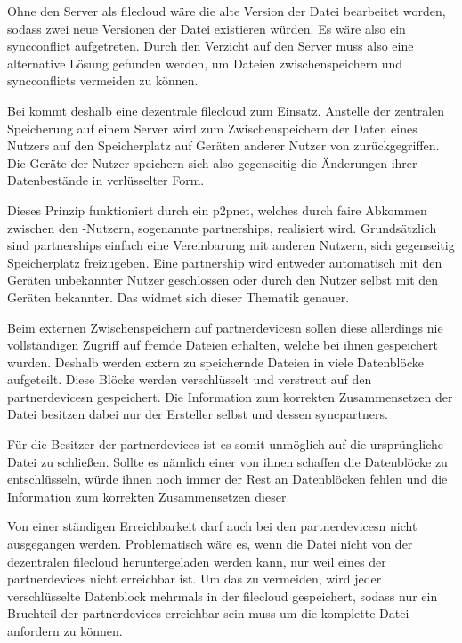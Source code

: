 Ohne den Server als \gls{filecloud} wäre die alte Version der Datei bearbeitet worden, sodass zwei
neue Versionen der Datei existieren würden. Es wäre also ein \gls{syncconflict} aufgetreten.
Durch den Verzicht auf den Server muss also eine alternative Lösung gefunden werden,
um Dateien zwischenspeichern und \glspl{syncconflict} vermeiden zu können.

Bei \sblit kommt deshalb eine dezentrale \gls{filecloud} zum Einsatz. Anstelle
der zentralen Speicherung auf einem Server wird zum Zwischenspeichern der Daten eines
Nutzers auf den Speicherplatz auf Geräten anderer Nutzer von \sblit zurückgegriffen.
Die Geräte der Nutzer speichern sich also gegenseitig die Änderungen ihrer Datenbestände
in verlüsselter Form.

Dieses Prinzip funktioniert durch ein \gls{p2pnet}, welches durch faire Abkommen zwischen den \sblit-Nutzern,
sogenannte \glspl{partnership}, realisiert wird. Grundsätzlich sind \glspl{partnership} einfach eine
Vereinbarung mit anderen Nutzern, sich gegenseitig Speicherplatz freizugeben.
Eine \gls{partnership} wird entweder automatisch mit den Geräten unbekannter Nutzer
geschlossen oder durch den Nutzer selbst mit den Geräten bekannter.
Das  widmet sich dieser Thematik genauer.

Beim externen Zwischenspeichern auf \glspl{partnerdevice}n sollen diese allerdings
nie vollständigen Zugriff auf fremde Dateien erhalten, welche bei ihnen gespeichert
wurden. Deshalb werden extern zu speichernde Dateien in viele Datenblöcke aufgeteilt.
Diese Blöcke werden verschlüsselt und verstreut auf den \glspl{partnerdevice}n gespeichert.
Die Information zum korrekten Zusammensetzen der Datei besitzen dabei nur der Ersteller selbst und dessen
\glspl{syncpartner}.

Für die Besitzer der \glspl{partnerdevice} ist es somit unmöglich auf die ursprüngliche
Datei zu schließen. Sollte es nämlich einer von ihnen schaffen die Datenblöcke zu
entschlüsseln, würde ihnen noch immer der Rest an Datenblöcken fehlen und die Information
zum korrekten Zusammensetzen dieser.

Von einer ständigen Erreichbarkeit darf auch bei den \glspl{partnerdevice}n nicht
ausgegangen werden. Problematisch wäre es, wenn die Datei nicht von der dezentralen
\gls{filecloud} heruntergeladen werden kann, nur weil eines der \glspl{partnerdevice}
nicht erreichbar ist. Um das zu vermeiden, wird jeder verschlüsselte Datenblock mehrmals
 in der \gls{filecloud} gespeichert, sodass nur ein Bruchteil der
\glspl{partnerdevice} erreichbar sein muss um die komplette Datei anfordern zu können.

